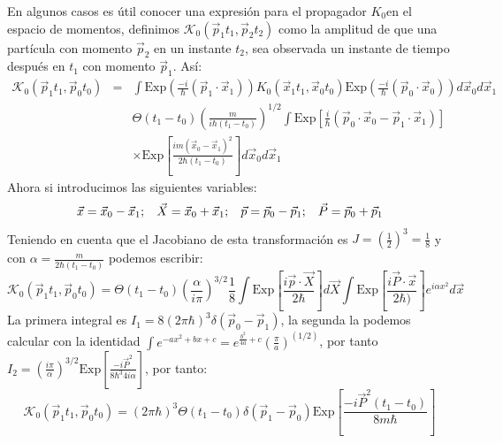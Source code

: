 En algunos casos es útil conocer una expresión para el propagador  $K_0$en el espacio de momentos, definimos $\mathcal{K}_0(\vec{p}_1t_1,\vec{p}_2t_2)$ como la amplitud de que una partícula con momento $\vec{p}_2$ en un instante $t_2$, sea observada un instante de tiempo después en $t_1$ con momento $\vec{p}_1$. Así:
\begin{eqnarray}
\nonumber \mathcal{K}_0(\vec{p}_1t_1,\vec{p}_0t_0)&=&\int \text{Exp}\left(\frac{-i}{\hbar}(\vec{p}_1\cdot\vec{x}_1)\right) K_0(\vec{x}_1t_1,\vec{x}_0t_0)\text{Exp}\left(\frac{-i}{\hbar}(\vec{p}_0\cdot\vec{x}_0)\right)d\vec{x}_0d\vec{x}_1\\
&&\nonumber \Theta(t_{1}-t_{0})\left(\frac{m}{i\hbar(t_{1}-t_{0})}\right)^{1/2}\int\text{Exp}\left[\frac{i}{\hbar}(\vec{p}_{0}\cdot\vec{x}_{0}-\vec{p}_{1}\cdot\vec{x}_{1})\right]\\
&& \times \text{Exp}\left[\frac{im(\vec{x}_{0}-\vec{x}_{1})^{2}}{2\hbar(t_{1}-t_{0})}\right]d\vec{x}_{0}d\vec{x}_{1}
\end{eqnarray}
Ahora si introducimos las siguientes variables:
\begin{equation}
\vec{x}=\vec{x}_0-\vec{x}_1;\hspace{0.3cm}\vec{X}=\vec{x}_0+\vec{x}_1;\hspace{0.3cm}\vec{p}=\vec{p}_0-\vec{p}_1;\hspace{0.3cm}\vec{P}=\vec{p}_0+\vec{p}_1
\end{equation}
Teniendo en cuenta que el Jacobiano de esta transformación es $J=\left(\frac{1}{2}\right)^3=\frac{1}{8}$ y con $\alpha=\frac{m}{2\hbar (t_1-t_0)}$  podemos escribir:
\begin{equation}
\mathcal{K}_0(\vec{p}_1t_1,\vec{p}_0t_0)=\Theta(t_{1}-t_{0})\left(\frac{\alpha}{i\pi}\right)^{3/2}\frac{1}{8}\int\text{Exp}\left[\frac{i\vec{p}\cdot\vec{X}}{2\hbar}\right]d\vec{X}\int\text{Exp}\left[\frac{i\vec{P}\cdot\vec{x}}{2\hbar)}\right]e^{i\alpha x^{2}}d\vec{x}
\end{equation}
La primera integral es $I_1=8(2\pi\hbar)^3\delta(\vec{p}_0-\vec{p}_1)$, la segunda la podemos calcular con la identidad $ \int e^{-ax^2+bx+c}=e^{\frac{b^2}{4a}+c}\left(\frac{\pi}{a}\right)^(1/2)$, por tanto $I_2=\left(\frac{i\pi}{\alpha}\right)^{3/2}\text{Exp}\left[\frac{-i\vec{P}^{2}}{8\hbar^{3}4i\alpha}\right]$, por tanto:
\begin{equation}
\mathcal{K}_0(\vec{p}_1t_1,\vec{p}_0t_0)=(2\pi\hbar)^3\Theta(t_1-t_0)\delta(\vec{p}_1-\vec{p}_0)\text{Exp}\left[\frac{-i\vec{P}^{2}(t_{1}-t_{0})}{8m\hbar}\right]
\end{equation}
